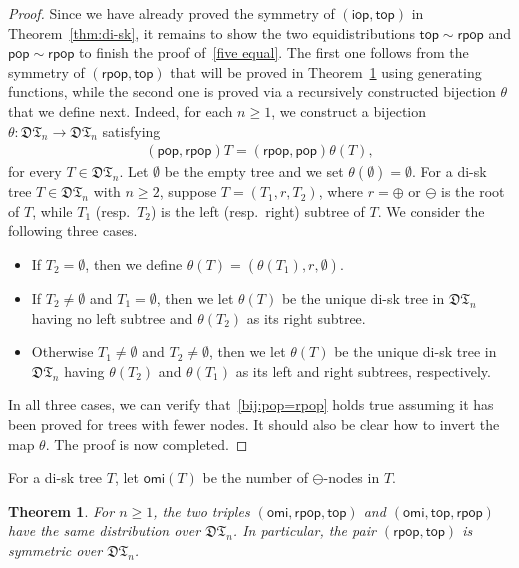 \documentclass[12pt]{amsart}
\numberwithin{equation}{section}
\theoremstyle{plain}
\newtheorem{theorem}{Theorem}[section]
\theoremstyle{definition}
\newcommand{\DT}{\mathfrak{DT}}
\def\iop{\mathsf{iop}}
\def\top{\mathsf{top}}
\def\pop{\mathsf{pop}}
\def\rpop{\mathsf{rpop}}
\def\omi{\mathsf{omi}}
\begin{document}
\begin{proof}
Since we have already proved the symmetry of $(\iop,\top)$ in Theorem~\ref{thm:di-sk}, it remains to show the two equidistributions $\top\sim\rpop$ and $\pop\sim\rpop$ 
to finish the proof of~\eqref{five equal}. The first one follows from the symmetry of $(\rpop,\top)$ that will be proved in Theorem~\ref{thm:rpop} using generating functions, while the second one is proved 
 via a recursively constructed bijection $\theta$ that we define next. Indeed, for each $n\ge 1$, we construct a bijection $\theta:\DT_n\rightarrow\DT_n$  satisfying 
\begin{align}\label{bij:pop=rpop}
(\pop,\rpop) T=(\rpop,\pop) \theta(T),
\end{align} 
for every $T\in\DT_n$. Let $\emptyset$ be the empty tree and we set $\theta(\emptyset)=\emptyset$. For a di-sk tree $T \in \mathfrak{DT}_n$ with $n \geq 2$, suppose $T=(T_1,r,T_2)$, where $r=\oplus$ or $\ominus$ is the root of $T$, while $T_1$ (resp.~$T_2$) is the left (resp.~right) subtree of $T$. We consider the following three cases.
\begin{itemize}
	\item If $T_2=\emptyset$, then we define $\theta(T)=(\theta(T_1),r,\emptyset)$.
	\item If $T_2\neq\emptyset$ and $T_1=\emptyset$, then we let $\theta(T)$ be the unique di-sk tree in $\DT_n$ having no left subtree and $\theta(T_2)$ as its right subtree.
	\item Otherwise $T_1\neq\emptyset$ and $T_2\neq\emptyset$, then we let $\theta(T)$ be the unique di-sk tree in $\DT_n$ having $\theta(T_2)$ and $\theta(T_1)$ as its left and right subtrees, respectively.
\end{itemize}
In all three cases, we can verify that~\eqref{bij:pop=rpop} holds true assuming it has been proved for trees with fewer nodes. It should also be clear how to invert the map $\theta$. The proof is now completed.
\end{proof}

For a di-sk tree $T$, let $\omi(T)$ be the number of $\ominus$-nodes in $T$. 
\begin{theorem}\label{thm:rpop}
For $n\geq1$, the two triples $(\omi,\rpop,\top)$ and $(\omi,\top,\rpop)$ have the same distribution over $\DT_n$.
In particular, the pair $(\rpop,\top)$ is symmetric over $\DT_n$.
\end{theorem}
\end{document}
